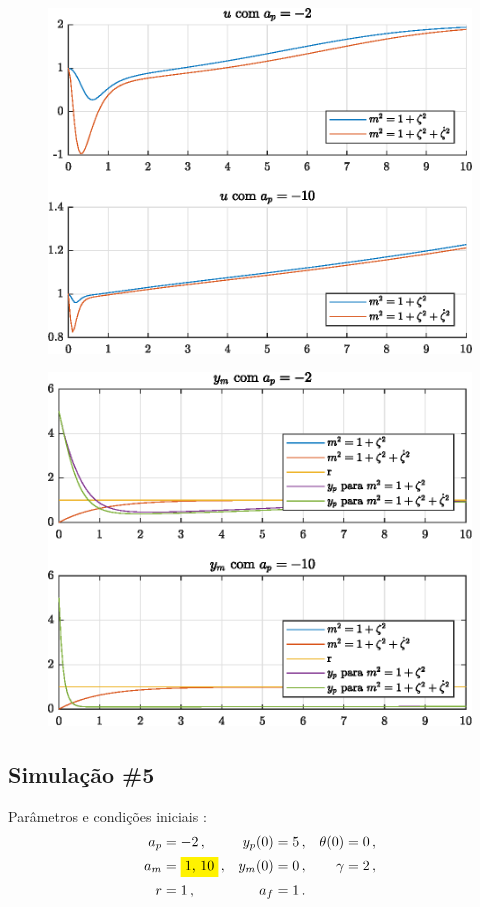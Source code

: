 \begin{figure}[H]
  \centering
  \includegraphics[width=12cm]{figs/u/ap-2ap-10.eps} 
\end{figure}

\begin{figure}[H]
  \centering
  \includegraphics[width=12cm]{figs/yp/ap-2ap-10.eps} 
\end{figure}

\newpage%
\subsection{Simulação \#5}

\bigskip%
Parâmetros e condições iniciais  :
%
\begin{align*}
  a_p &= -2\,,  &  y_p(0) &= 5\,, & \theta(0) &= 0\,, \\
  a_m &= \HI{1, 10}\,,   &  y_m(0) &= 0\,, & \gamma &= 2\,, \\
  r &= 1\,, & a_f &= 1\,.
\end{align*}


